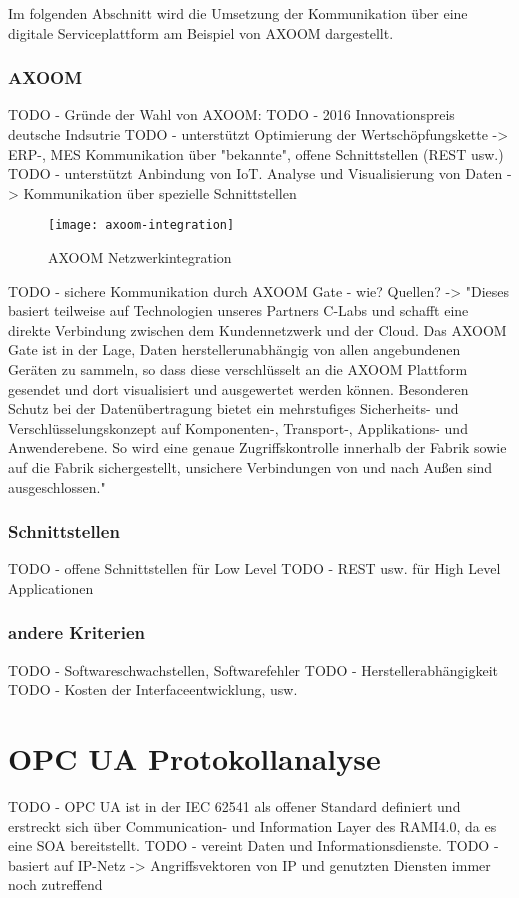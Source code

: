 Im folgenden Abschnitt wird die Umsetzung der Kommunikation über eine digitale Serviceplattform am Beispiel von AXOOM dargestellt.

\subsubsection{AXOOM}
TODO - Gründe der Wahl von AXOOM: 
TODO - 2016 Innovationspreis deutsche Indsutrie
TODO - unterstützt Optimierung der Wertschöpfungskette -> ERP-, MES Kommunikation über "bekannte", offene Schnittstellen (REST usw.) 
TODO - unterstützt Anbindung von \ac{IoT}. Analyse und Visualisierung von Daten -> Kommunikation über spezielle Schnittstellen

\begin{figure}[h]
    \centering
    \texttt{[image: axoom-integration]}
    \caption{AXOOM Netzwerkintegration}
    \label{Kap3:AXOOM Netzwerkintegration}
  \end{figure}
  
\clearpage

TODO - sichere Kommunikation durch AXOOM Gate - wie? Quellen? -> "Dieses basiert teilweise auf Technologien unseres Partners C-Labs und schafft eine direkte Verbindung zwischen dem Kundennetzwerk und der Cloud. Das AXOOM Gate ist in der Lage, Daten herstellerunabhängig von allen angebundenen Geräten zu sammeln, so dass diese verschlüsselt an die AXOOM Plattform gesendet und dort visualisiert und ausgewertet werden können. Besonderen Schutz bei der Datenübertragung bietet ein mehrstufiges Sicherheits- und Verschlüsselungskonzept auf Komponenten-, Transport-, Applikations- und Anwenderebene. So wird eine genaue Zugriffskontrolle innerhalb der Fabrik sowie auf die Fabrik sichergestellt, unsichere Verbindungen von und nach Außen sind ausgeschlossen."

\subsubsection{Schnittstellen}
TODO - offene Schnittstellen für Low Level
TODO - REST usw. für High Level Applicationen

\subsubsection{andere Kriterien}
TODO - Softwareschwachstellen, Softwarefehler 
TODO - Herstellerabhängigkeit
TODO - Kosten der Interfaceentwicklung, usw.

\section{\ac{OPC UA} Protokollanalyse}
TODO - \ac{OPC UA} ist in der \ac{IEC} 62541 als offener Standard definiert und erstreckt sich über Communication- und Information Layer des \ac{RAMI4.0}, da es eine \ac{SOA} bereitstellt. 
TODO - vereint Daten und Informationsdienste. 
TODO - basiert auf IP-Netz -> Angriffsvektoren von IP und genutzten Diensten immer noch zutreffend


